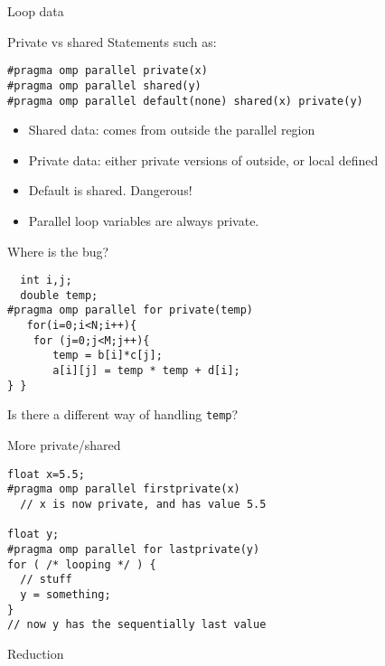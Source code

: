  {Loop data}

\begin{numberedframe}{Private vs shared}
Statements such as:
\begin{lstlisting}
#pragma omp parallel private(x)
#pragma omp parallel shared(y)
#pragma omp parallel default(none) shared(x) private(y)
\end{lstlisting}
  \begin{itemize}
  \item Shared data: comes from outside the parallel region
  \item Private data: either private versions of outside, or local defined
  \item Default is shared. Dangerous!
  \item Parallel loop variables are always private.
  \end{itemize}
\end{numberedframe}

\begin{numberedframe}{Where is the bug?}
\begin{lstlisting}
  int i,j;
  double temp;
#pragma omp parallel for private(temp)
   for(i=0;i<N;i++){
    for (j=0;j<M;j++){
       temp = b[i]*c[j];
       a[i][j] = temp * temp + d[i];
} }  
\end{lstlisting}
Is there a different way of handling \lstinline{temp}?
\end{numberedframe}

\begin{numberedframe}{More private/shared}
\begin{lstlisting}
float x=5.5;
#pragma omp parallel firstprivate(x)
  // x is now private, and has value 5.5

float y;
#pragma omp parallel for lastprivate(y)
for ( /* looping */ ) {
  // stuff
  y = something;
}
// now y has the sequentially last value
\end{lstlisting}
\end{numberedframe}

 {Reduction}

\begin{exerciseframe}
  
\end{exerciseframe}

